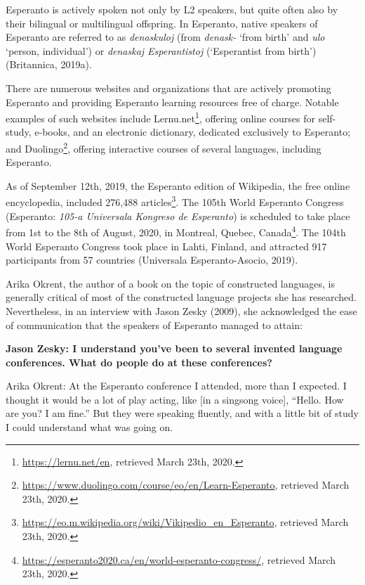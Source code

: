 Esperanto is actively spoken not only by L2 speakers, but quite often also by their bilingual or multilingual offspring.
In Esperanto, native speakers of Esperanto are referred to as \textit{denaskuloj} (from \textit{denask-} `from birth' and \textit{ulo} `person, individual') or \textit{denaskaj Esperantistoj} (`Esperantist from birth')
(Britannica, 2019a).

There are numerous websites and organizations that are actively promoting Esperanto and providing Esperanto learning resources free of charge.
Notable examples of such websites include Lernu.net\footnote{\url{https://lernu.net/en}, retrieved March 23th, 2020.}, offering online courses for self-study, e-books, and an electronic dictionary, dedicated exclusively to Esperanto; and Duolingo\footnote{\url{https://www.duolingo.com/course/eo/en/Learn-Esperanto}, retrieved March 23th, 2020.}, offering interactive courses of several languages, including Esperanto.

As of September 12th, 2019, the Esperanto edition of Wikipedia, the free online encyclopedia, included 276,488 articles\footnote{\url{https://eo.m.wikipedia.org/wiki/Vikipedio_en_Esperanto}, retrieved March 23th, 2020.}.
The 105th World Esperanto Congress (Esperanto: \textit{105-a Universala Kongreso de Esperanto}) is scheduled to take place from 1st to the 8th of August, 2020, in Montreal, Quebec, Canada\footnote{\url{https://esperanto2020.ca/en/world-esperanto-congress/}, retrieved March 23th, 2020.}.
The 104th World Esperanto Congress took place in Lahti, Finland, and attracted 917 participants from 57 countries (Universala Esperanto-Asocio, 2019).


Arika Okrent, the author of a book on the topic of constructed languages, is generally critical of most of the constructed language projects she has researched.
Nevertheless, in an interview with Jason Zesky (2009), she acknowledged the ease of communication that the speakers of Esperanto managed to attain:

\begin{displayquote}
  {\bfseries Jason Zesky: I understand you've been to several invented language conferences. What do people do at these conferences?}

  Arika Okrent: At the Esperanto conference I attended, more than I expected. I thought it would be a lot of play acting, like [in a singsong voice], ``Hello. How are you? I am fine.'' But they were speaking fluently, and with a little bit of study I could understand what was going on. %
\end{displayquote}


